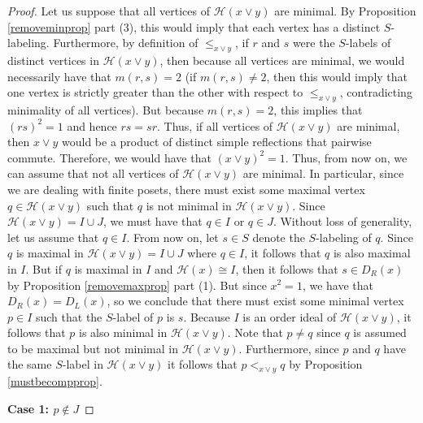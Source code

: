 \documentclass[10pt,a4paper]{amsart}
\def\H#1{\mathcal{H}(#1)}
\begin{document}
\begin{proof}
    Let us suppose that all vertices of $ \H{x \vee y}$ are minimal. By Proposition \ref{removeminprop} part (3), this would imply that each vertex has a distinct $S$-labeling. Furthermore, by definition of $ \leq_{x\vee y}$, if $ r$ and $s$ were the $S$-labels of distinct vertices in $ \H{x\vee y}$, then because all vertices are minimal, we would necessarily have that $ m(r,s)  =2$ (if $m(r,s)\neq 2$, then this would imply that one vertex is strictly greater than the other with respect to $ \leq_{x\vee y}$, contradicting minimality of all vertices). But because $ m(r,s) = 2$, this implies that $ (rs)^{2} = 1$ and hence $ rs=sr$. Thus, if all vertices of $ \H{x\vee y}$ are minimal, then $ x\vee y$ would be a product of distinct simple reflections that pairwise commute. Therefore, we would have that $ (x\vee y)^{2} = 1$. Thus, from now on, we can assume that not all vertices of $ \H{x\vee y}$ are minimal. In particular, since we are dealing with finite posets, there must exist some maximal vertex $ q \in \H{x\vee y}$ such that $ q$ is not minimal in $ \H{x\vee y}$. Since $ \H{x\vee y} = I \cup J$, we must have that $ q\in I$ or $ q\in J$. Without loss of generality, let us assume that $ q\in I$. From now on, let $ s\in S$ denote the $S$-labeling of $q$. Since $ q$ is maximal in $ \H{x\vee y} = I \cup J$ where $ q\in I$, it follows that $ q$ is also maximal in $I$. But if $ q$ is maximal in $I$ and $ \H{x} \cong I$, then it follows that $ s\in D_{R}(x)$ by Proposition \ref{removemaxprop} part (1). But since $ x^{2}=1$, we have that $ D_{R}(x) = D_{L}(x)$, so we conclude that there must exist some minimal vertex $ p \in I$ such that the $S$-label of $p$ is $s$. Because $ I$ is an order ideal of $\H{x\vee y}$, it follows that $p$ is also minimal in $ \H{x\vee y}$. Note that $ p \neq q$ since $ q$ is assumed to be maximal but not minimal in $ \H{x\vee y}$. Furthermore, since $p$ and $ q$ have the same $S$-label in $ \H{x\vee y}$ it follows that $p <_{x\vee y} q$ by Proposition \ref{mustbecompprop}.

    \textbf{Case 1: $p\notin J$}
    

\end{proof}
\end{document}
